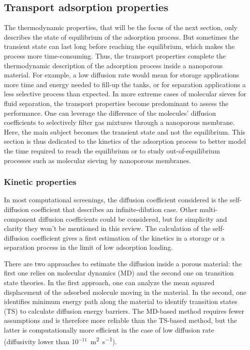 \documentclass[main.tex]{subfiles}
\begin{document}
\subsection{Transport adsorption properties}

The thermodynamic properties, that will be the focus of the next section, only describes the state of equilibrium of the adsorption process. But sometimes the transient state can last long before reaching the equilibrium, which makes the process more time-consuming. Thus, the transport properties complete the thermodynamic description of the adsorption process inside a nanoporous material. For example, a low diffusion rate would mean for storage applications more time and energy needed to fill-up the tanks, or for separation applications a less selective process than expected. In more extreme cases of molecular sieves for fluid separation, the transport properties become predominant to assess the performance. One can leverage the difference of the molecules' diffusion coefficients to selectively filter gas mixtures through a nanoporous membrane.\autocite{Miandoab_2021} Here, the main subject becomes the transient state and not the equilibrium. This section is thus dedicated to the kinetics of the adsorption process to better model the time required to reach the equilibrium or to study out-of-equilibrium processes such as molecular sieving by nanoporous membranes.

\subsubsection{Kinetic properties}

In most computational screenings, the diffusion coefficient considered is the self-diffusion coefficient that describes an infinite-dilution case. Other multi-component diffusion coefficients could be considered, but for simplicity and clarity they won't be mentioned in this review. The calculation of the self-diffusion coefficient gives a first estimation of the kinetics in a storage or a separation process in the limit of low adsorption loading.

There are two approaches to estimate the diffusion inside a porous material: the first one relies on molecular dynamics (MD) and the second one on transition state theories. In the first approach, one can analyze the mean squared displacement of the adsorbed molecule moving in the material. In the second, one identifies minimum energy path along the material to identify transition states (TS) to calculate diffusion energy barriers. The MD-based method requires fewer assumptions and is therefore more reliable than the TS-based method, but the latter is computationally more efficient in the case of low diffusion rate (diffusivity lower than 10$^{-11}$~\si{\square\meter\per\second}).
\end{document}
